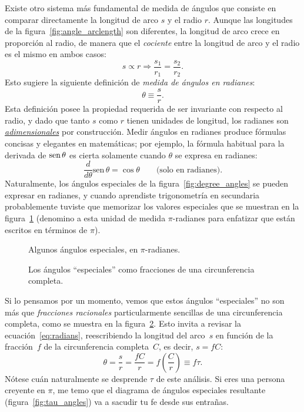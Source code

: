 Existe otro sistema más fundamental de medida de ángulos que consiste en comparar directamente la longitud de arco $s$ y el radio $r$. Aunque las longitudes de la figura~\ref{fig:angle_arclength} son diferentes, la longitud de arco crece en proporción al radio, de manera que el \emph{cociente} entre la longitud de arco y el radio es el mismo en ambos casos:
\[
s\propto r \Rightarrow \frac{s_1}{r_1} = \frac{s_2}{r_2}.
\]
Esto sugiere la siguiente definición de  \emph{medida de ángulos en radianes}:
\begin{equation}
\label{eq:radians}
\theta \equiv \frac{s}{r}.
\end{equation}
Esta definición posee la propiedad requerida de ser invariante con respecto al radio, y dado que tanto $s$ como $r$ tienen unidades de longitud, los radianes son \href{https://es.wikipedia.org/wiki/Magnitud_adimensional}{\emph{adimensionales}} por construcción. Medir ángulos en radianes produce fórmulas concisas y elegantes en matemáticas; por ejemplo, la fórmula habitual para la derivada de  $\mbox{sen}\,\theta$ es cierta solamente cuando $\theta$ se expresa en radianes:
\[
  \frac{d}{d\theta}\mbox{sen}\,\theta = \cos\theta \qquad\mbox{(solo en radianes).}
\]
Naturalmente, los ángulos especiales de la figura~\ref{fig:degree_angles} se pueden expresar en radianes, y cuando aprendiste trigonometría en secundaria probablemente tuviste que memorizar los valores especiales que se muestran en la figura~\ref{fig:pi_angles} (denomino a esta unidad de medida $\pi$-radianes para enfatizar que están escritos en términos de $\pi$).

\begin{figure}
\begin{center}
\end{center}
\caption{Algunos ángulos especiales, en $\pi$-radianes.\label{fig:pi_angles}}
\end{figure}

\begin{figure}
\begin{center}
\end{center}
\caption{Los ángulos ``especiales'' como fracciones de una circunferencia completa.\label{fig:angle_fractions}}
\end{figure}

Si lo pensamos por un momento, vemos que estos ángulos ``especiales'' no son más que \emph{fracciones racionales} particularmente sencillas de una circunferencia completa, como se muestra en la figura~\ref{fig:angle_fractions}. Esto invita a revisar la ecuación~\eqref{eq:radians}, reescribiendo la longitud del arco~$s$ en función de la fracción~$f$ de la circunferencia completa~$C$, es decir, $s = f C$:
\begin{equation}
\label{eq:circle_fraction}
\theta = \frac{s}{r} = \frac{fC}{r} =  f\left(\frac{C}{r}\right) \equiv f\tau.
\end{equation}
Nótese cuán naturalmente se desprende $\tau$ de este análisis. Si eres una persona creyente en $\pi$, me temo que el diagrama  de ángulos especiales resultante (figura~\ref{fig:tau_angles}) va a sacudir tu fe desde sus entrañas.

